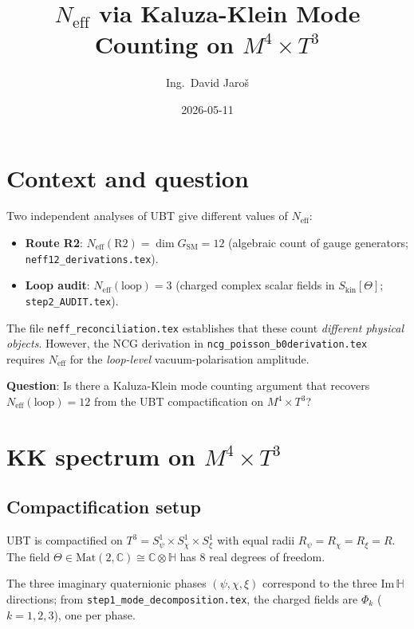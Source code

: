 \documentclass[12pt,a4paper]{article}
\title{$N_{\mathrm{eff}}$ via Kaluza-Klein Mode Counting on $M^4 \times T^3$}
\author{Ing.\ David Jaro\v{s}}
\date{2026-05-11}
\newcommand{\Neff}{N_{\mathrm{eff}}}
\begin{document}
  \maketitle
\fi

\section{Context and question}

Two independent analyses of UBT give different values of $\Neff$:
\begin{itemize}
  \item \textbf{Route R2}: $\Neff(\mathrm{R2}) = \dim G_{\mathrm{SM}} = 12$
        (algebraic count of gauge generators; \texttt{neff12\_derivations.tex}).
  \item \textbf{Loop audit}: $\Neff(\mathrm{loop}) = 3$ (charged complex scalar
        fields in $S_{\mathrm{kin}}[\Theta]$; \texttt{step2\_AUDIT.tex}).
\end{itemize}
The file \texttt{neff\_reconciliation.tex} establishes that these count
\emph{different physical objects}.  However, the NCG derivation in
\texttt{ncg\_poisson\_b0derivation.tex} requires $\Neff$ for the
\emph{loop-level} vacuum-polarisation amplitude.

\textbf{Question}: Is there a Kaluza-Klein mode counting argument that
recovers $\Neff(\mathrm{loop}) = 12$ from the UBT compactification on
$M^4 \times T^3$?

\section{KK spectrum on $M^4 \times T^3$}

\subsection{Compactification setup}

UBT is compactified on $T^3 = S^1_\psi \times S^1_\chi \times S^1_\xi$ with
equal radii $R_\psi = R_\chi = R_\xi = R$.
The field $\Theta \in \mathrm{Mat}(2,\mathbb{C}) \cong \mathbb{C} \otimes \mathbb{H}$
has 8 real degrees of freedom.

The three imaginary quaternionic phases $(\psi, \chi, \xi)$ correspond to the
three $\mathrm{Im}\,\mathbb{H}$ directions; from \texttt{step1\_mode\_decomposition.tex},
the charged fields are $\Phi_k$ ($k = 1,2,3$), one per phase.
\end{document}
